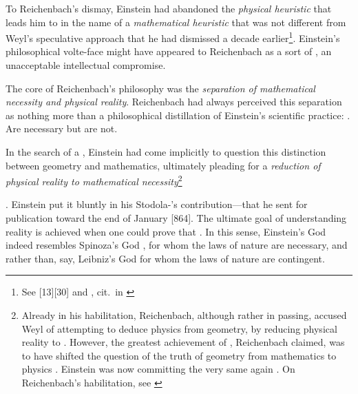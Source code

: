 \documentclass[draft]{article}
\begin{document}
To Reichenbach's dismay, Einstein had abandoned the \emph{physical heuristic} that leads him to \gr in the name of a \emph{mathematical heuristic} that was not different from Weyl's speculative approach that he had dismissed a decade earlier\footnote{See [13][30] and , cit.\ in \cite[274f.]{Seelig1960}}. Einstein's philosophical volte-face might have appeared to Reichenbach as a sort of , an unacceptable intellectual compromise. \begin{inparaenum}[(a)] \item The core of Reichenbach's philosophy was the \emph{separation of mathematical necessity and physical reality}. Reichenbach had always perceived this separation as nothing more than a philosophical distillation of Einstein's scientific practice: . Are necessary but are not.

\item In the search of a \uft, Einstein had come implicitly to question this distinction between geometry and mathematics, ultimately pleading for a \emph{reduction of physical reality to mathematical necessity}\footnote{Already in his habilitation, Reichenbach, although rather in passing, accused Weyl of attempting to deduce physics from geometry, by reducing physical reality to  \citep[73]{Reichenbach1920a}. However, the greatest achievement of \gr, Reichenbach claimed, was to have shifted the question of the truth of geometry from mathematics to physics \citep[73]{Reichenbach1920a}. Einstein was now committing the very same  again \citep[73]{Reichenbach1920a}. On Reichenbach's habilitation, see \citet{Padovani2009}} \end{inparaenum}. Einstein put it bluntly in his Stodola-'s contribution---that he sent for publication toward the end of January [864]. The ultimate goal of understanding reality is achieved when one could prove that  \citep[127]{Einstein1929}. In this sense, Einstein's God indeed resembles Spinoza's God \citep{Einstein1929e}, for whom the laws of nature are necessary, and rather than, say, Leibniz's God for whom the laws of nature are contingent. 
\end{document}
